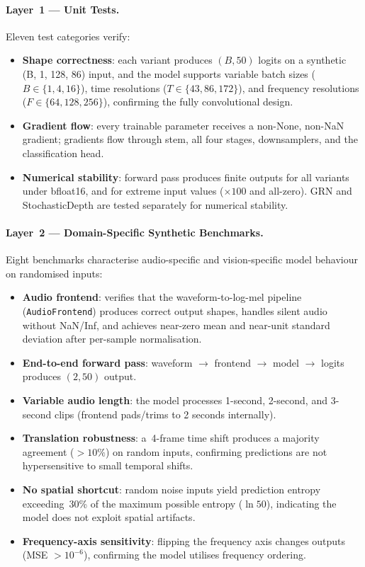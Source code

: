 \documentclass{article}
\begin{document}
\paragraph{Layer~1 --- Unit Tests.}
Eleven test categories verify:
\begin{itemize}
  \item \textbf{Shape correctness}: each variant produces $(B, 50)$ logits on a
  synthetic (B, 1, 128, 86) input, and the model supports variable batch sizes
  ($B \in \{1, 4, 16\}$), time resolutions ($T \in \{43, 86, 172\}$), and
  frequency resolutions ($F \in \{64, 128, 256\}$), confirming the fully
  convolutional design.
  \item \textbf{Gradient flow}: every trainable parameter receives a non-None,
  non-NaN gradient; gradients flow through stem, all four stages, downsamplers,
  and the classification head.
  \item \textbf{Numerical stability}: forward pass produces finite outputs for
  all variants under bfloat16, and for extreme input values ($\times 100$ and
  all-zero). GRN and StochasticDepth are tested separately for numerical
  stability.
\end{itemize}

\paragraph{Layer~2 --- Domain-Specific Synthetic Benchmarks.}
Eight benchmarks characterise audio-specific and vision-specific model
behaviour on randomised inputs:
\begin{itemize}
  \item \textbf{Audio frontend}: verifies that the waveform-to-log-mel pipeline
  (\texttt{AudioFrontend}) produces correct output shapes, handles silent audio
  without NaN/Inf, and achieves near-zero mean and near-unit standard deviation
  after per-sample normalisation.
  \item \textbf{End-to-end forward pass}: waveform $\rightarrow$ frontend
  $\rightarrow$ model $\rightarrow$ logits produces $(2, 50)$ output.
  \item \textbf{Variable audio length}: the model processes 1-second, 2-second,
  and 3-second clips (frontend pads/trims to 2 seconds internally).
  \item \textbf{Translation robustness}: a~4-frame time shift produces a
  majority agreement ($>10\%$) on random inputs, confirming predictions are not
  hypersensitive to small temporal shifts.
  \item \textbf{No spatial shortcut}: random noise inputs yield prediction
  entropy exceeding~30\% of the maximum possible entropy ($\ln 50$), indicating
  the model does not exploit spatial artifacts.
  \item \textbf{Frequency-axis sensitivity}: flipping the frequency axis changes
  outputs (MSE $> 10^{-6}$), confirming the model utilises frequency ordering.
\end{itemize}
\end{document}
